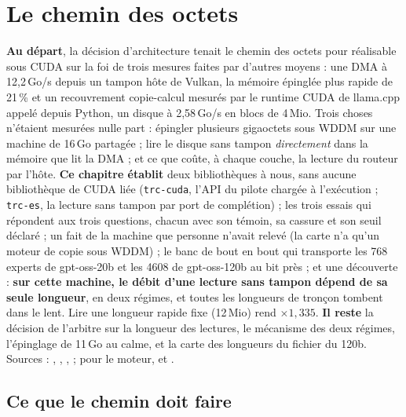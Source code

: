\chapter{Le chemin des octets}\label{ch:t2-chemin}
\ifdefined\GrapheChmSync\else\fi

\begin{origine}
\textbf{Au départ}, la décision d'architecture tenait le chemin des octets pour réalisable sous CUDA sur la foi de trois mesures faites par d'autres moyens : une DMA à 12,2\,Go/s depuis un tampon hôte de Vulkan, la mémoire épinglée plus rapide de 21\,\% et un recouvrement copie-calcul mesurés par le runtime CUDA de llama.cpp appelé depuis Python, un disque à 2,58\,Go/s en blocs de 4\,Mio. Trois choses n'étaient mesurées nulle part : épingler plusieurs gigaoctets sous WDDM sur une machine de 16\,Go partagée ; lire le disque sans tampon \emph{directement} dans la mémoire que lit la DMA ; et ce que coûte, à chaque couche, la lecture du routeur par l'hôte.
\textbf{Ce chapitre établit} deux bibliothèques à nous, sans aucune bibliothèque de CUDA liée (\texttt{trc-cuda}, l'API du pilote chargée à l'exécution ; \texttt{trc-es}, la lecture sans tampon par port de complétion) ; les trois essais qui répondent aux trois questions, chacun avec son témoin, sa cassure et son seuil déclaré ; un fait de la machine que personne n'avait relevé (la carte n'a qu'un moteur de copie sous WDDM) ; le banc de bout en bout qui transporte les \num{768} experts de gpt-oss-20b et les \num{4608} de gpt-oss-120b au bit près ; et une découverte : \textbf{sur cette machine, le débit d'une lecture sans tampon dépend de sa seule longueur}, en deux régimes, et toutes les longueurs de tronçon tombent dans le lent. Lire une longueur rapide fixe (12\,Mio) rend $\times 1{,}335$.
\textbf{Il reste} la décision de l'arbitre sur la longueur des lectures, le mécanisme des deux régimes, l'épinglage de 11\,Go au calme, et la carte des longueurs du fichier du 120b.
Sources : , , ,  ; pour le moteur,  et .
\end{origine}

\section{Ce que le chemin doit faire}\label{sec:t2c-tache}

